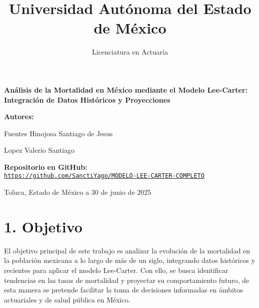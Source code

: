 \documentclass[
]{article}
\title{Universidad Autónoma del Estado de México}
\subtitle{Licenciatura en Actuaría}
\author{}
\date{\vspace{-2.5em}}
\begin{document}
\maketitle

\begin {centering}
\Huge \bfseries Análisis de la Mortalidad en México mediante el Modelo Lee-Carter: Integración de Datos Históricos y Proyecciones \par
\end {centering}
\vspace*{2cm}

\vspace{1cm}
\vspace{2cm}

\begin{centering}
\huge \bfseries 
Autores:


Fuentes Hinojosa Santiago de Jesus

Lopez Valerio Santiago \par
\end{centering}
\vspace*{2cm}

\begin{center}
\Large \textbf{Repositorio en GitHub:} \\
\href{https://github.com/SanctiYago/MODELO-LEE-CARTER-COMPLETO}{\Large \texttt{https://github.com/SanctiYago/MODELO-LEE-CARTER-COMPLETO}}
\end{center}

\vfill
\large  \par
\vfill

Toluca, Estado de México a 30 de junio de 2025

\clearpage
\raggedright

\clearpage

\tableofcontents
\clearpage

\justify

\hypertarget{objetivo}{%
\section{1. Objetivo}\label{objetivo}}

El objetivo principal de este trabajo es analizar la evolución de la
mortalidad en la población mexicana a lo largo de más de un siglo,
integrando datos históricos y recientes para aplicar el modelo
Lee-Carter. Con ello, se busca identificar tendencias en las tasas de
mortalidad y proyectar su comportamiento futuro, de esta manera se
pretende facilitar la toma de decisiones informadas en ámbitos
actuariales y de salud pública en México.
\end{document}
